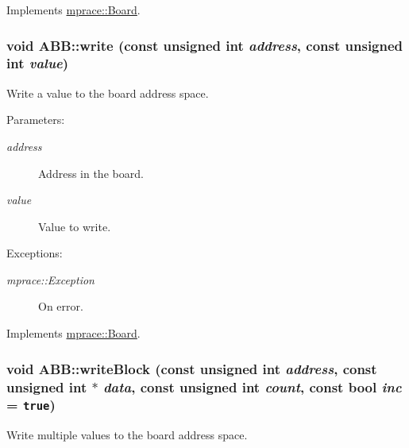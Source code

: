 Implements \hyperlink{classmprace_1_1Board_a16}{mprace::Board}.\hypertarget{classmprace_1_1ABB_a4}{
\subsubsection[write]{\setlength{\rightskip}{0pt plus 5cm}void ABB::write (const unsigned int {\em address}, const unsigned int {\em value})}}
\label{classmprace_1_1ABB_a4}


Write a value to the board address space. 

\begin{Desc}
\item[Parameters:]
\begin{description}
\item[{\em address}]Address in the board. \item[{\em value}]Value to write. \end{description}
\end{Desc}
\begin{Desc}
\item[Exceptions:]
\begin{description}
\item[{\em mprace::Exception}]On error.\end{description}
\end{Desc}


Implements \hyperlink{classmprace_1_1Board_a3}{mprace::Board}.\hypertarget{classmprace_1_1ABB_a6}{
\subsubsection[writeBlock]{\setlength{\rightskip}{0pt plus 5cm}void ABB::write\-Block (const unsigned int {\em address}, const unsigned int $\ast$ {\em data}, const unsigned int {\em count}, const bool {\em inc} = {\tt true})}}
\label{classmprace_1_1ABB_a6}


Write multiple values to the board address space. 

